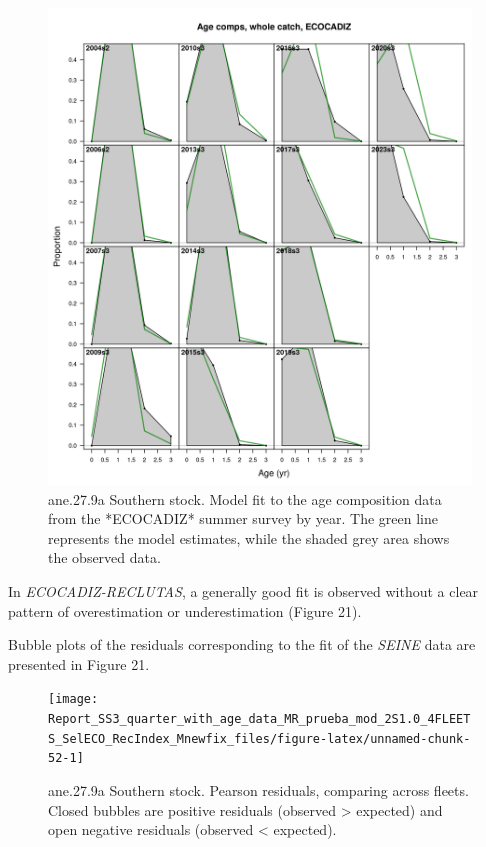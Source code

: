 \documentclass[
]{article}
\begin{document}
\begin{figure}[H]

{\centering \includegraphics[width=0.95\linewidth]{report/run/S1.0_4FLEETS_SelECO_RecIndex_Mnewfix/fig_age_fit_Ecocadiz} 

}

\caption{ane.27.9a Southern stock. Model fit to the age composition data from the *ECOCADIZ* summer survey by year. The green line represents the model estimates, while the shaded grey area shows the observed data.}\label{fig:unnamed-chunk-50}
\end{figure}

In \emph{ECOCADIZ-RECLUTAS}, a generally good fit is observed without a
clear pattern of overestimation or underestimation (Figure 21).

Bubble plots of the residuals corresponding to the fit of the
\emph{SEINE} data are presented in Figure 21.

\begin{figure}[H]

{\centering \texttt{[image: Report\_SS3\_quarter\_with\_age\_data\_MR\_prueba\_mod\_2S1.0\_4FLEETS\_SelECO\_RecIndex\_Mnewfix\_files/figure-latex/unnamed-chunk-52-1]} 

}

\caption{ane.27.9a Southern stock.  Pearson residuals, comparing across fleets. Closed bubbles are positive residuals (observed > expected) and open negative residuals (observed < expected).}\label{fig:unnamed-chunk-52}
\end{figure}
\end{document}
